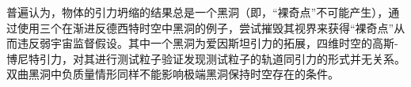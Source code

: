 \begin{cabstract}
    普遍认为，物体的引力坍缩的结果总是一个黑洞（即，“裸奇点”不可能产生），通过使用三个在渐进反德西特时空中黑洞的例子，尝试摧毁其视界来获得“裸奇点”从而违反弱宇宙监督假设。其中一个黑洞为爱因斯坦引力的拓展，四维时空的高斯-博尼特引力，对其进行测试粒子验证发现测试粒子的轨道同引力的形式并无关系。双曲黑洞中负质量情形同样不能影响极端黑洞保持时空存在的条件。
\end{cabstract}

\begin{eabstract}

\end{eabstract}

\makecover
\tableofcontents

